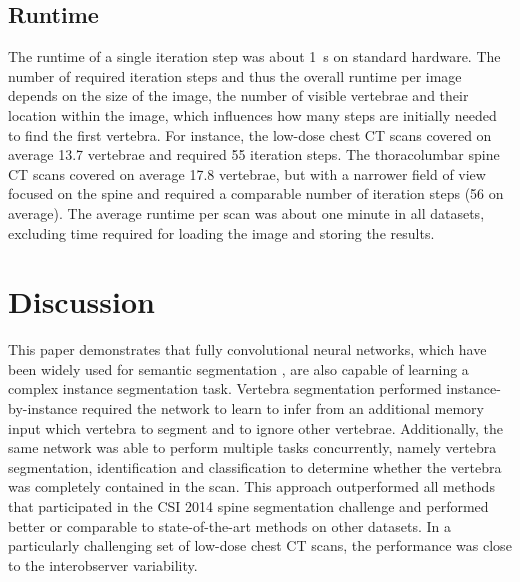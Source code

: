\documentclass[authoryear,5p,final,times]{elsarticle}
\begin{document}
	\subsection{Runtime}

	The runtime of a single iteration step was about \SI{1}{\second} on standard hardware. The number of required iteration steps and thus the overall runtime per image depends on the size of the image, the number of visible vertebrae and their location within the image, which influences how many steps are initially needed to find the first vertebra. For instance, the low-dose chest CT scans covered on average \num{13.7} vertebrae and required \num{55} iteration steps. The thoracolumbar spine CT scans covered on average \num{17.8} vertebrae, but with a narrower field of view focused on the spine and required a comparable number of iteration steps (\num{56} on average). The average runtime per scan was about one minute in all datasets, excluding time required for loading the image and storing the results.

    \section{Discussion}

    This paper demonstrates that fully convolutional neural networks, which have been widely used for semantic segmentation \citep{Litjens2017}, are also capable of learning a complex instance segmentation task. Vertebra segmentation performed instance-by-instance required the network to learn to infer from an additional memory input which vertebra to segment and to ignore other vertebrae. Additionally, the same network was able to perform multiple tasks concurrently, namely vertebra segmentation, identification and classification to determine whether the vertebra was completely contained in the scan. This approach outperformed all methods that participated in the CSI 2014 spine segmentation challenge \citep{Yao2016} and performed better or comparable to state-of-the-art methods on other datasets. In a particularly challenging set of low-dose chest CT scans, the performance was close to the interobserver variability.
\end{document}
